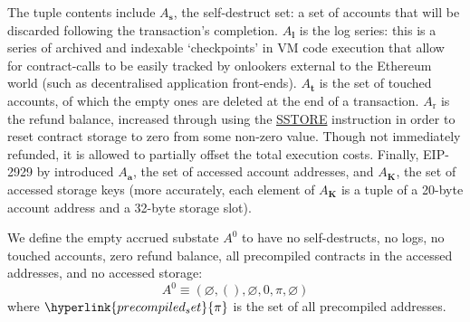 \documentclass[9pt,oneside]{amsart}
\begin{document}
\begin{multicols}{2}
\hypertarget{self_destruct_set_wordy_defn_A__s}{}The tuple contents include $A_{\mathbf{s}}$, the self-destruct set: a set of accounts that will be discarded following the transaction's completion.
\hypertarget{tx_log_series_wordy_defn_A__l}{} $A_{\mathbf{l}}$ is the log series: this is a series of archived and indexable `checkpoints' in VM code execution that allow for contract-calls to be easily tracked by onlookers external to the Ethereum world (such as decentralised application front-ends).
\hypertarget{tx_touched_accounts_wordy_defn_A__t}{} $A_{\mathbf{t}}$ is the set of touched accounts, of which the empty ones are deleted at the end of a transaction.
\hypertarget{refund_balance_defn_words_A__r}{}$A_{\mathrm{r}}$ is the refund balance, increased through using the \hyperlink{SSTORE}{{\small SSTORE}} instruction in order to reset contract storage to zero from some non-zero value. Though not immediately refunded, it is allowed to partially offset the total execution costs.
Finally, EIP-2929 by \cite{EIP-2929} introduced \hypertarget{accessed_addresses_defn_words_A__a}{}$A_{\mathbf{a}}$, the set of accessed account addresses, and \hypertarget{accessed_storage_keys_defn_words_A__k}{}$A_{\mathbf{K}}$, the set of accessed storage keys
(more accurately, each element of $A_{\mathbf{K}}$ is a tuple of a 20-byte account address and a 32-byte storage slot).

We define the empty accrued substate $A^0$ to have no self-destructs, no logs, no touched accounts, zero refund balance, all precompiled contracts in the accessed addresses, and no accessed storage:
\begin{equation}
A^0 \equiv (\varnothing, (), \varnothing, 0, \pi, \varnothing)
\end{equation}
where $\hyperlink{precompiled_set}{\pi}$ is the set of all precompiled addresses.


\end{multicols}
\end{document}

